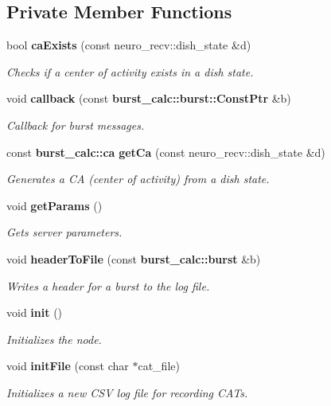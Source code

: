 \subsection*{\-Private \-Member \-Functions}
\begin{DoxyCompactItemize}
\item 
bool {\bf ca\-Exists} (const neuro\-\_\-recv\-::dish\-\_\-state \&d)
\begin{DoxyCompactList}\small\item\em \-Checks if a center of activity exists in a dish state. \end{DoxyCompactList}\item 
void {\bf callback} (const {\bf burst\-\_\-calc\-::burst\-::\-Const\-Ptr} \&b)
\begin{DoxyCompactList}\small\item\em \-Callback for burst messages. \end{DoxyCompactList}\item 
const {\bf burst\-\_\-calc\-::ca} {\bf get\-Ca} (const neuro\-\_\-recv\-::dish\-\_\-state \&d)
\begin{DoxyCompactList}\small\item\em \-Generates a \-C\-A (center of activity) from a dish state. \end{DoxyCompactList}\item 
void {\bf get\-Params} ()
\begin{DoxyCompactList}\small\item\em \-Gets server parameters. \end{DoxyCompactList}\item 
void {\bf header\-To\-File} (const {\bf burst\-\_\-calc\-::burst} \&b)
\begin{DoxyCompactList}\small\item\em \-Writes a header for a burst to the log file. \end{DoxyCompactList}\item 
void {\bf init} ()
\begin{DoxyCompactList}\small\item\em \-Initializes the node. \end{DoxyCompactList}\item 
void {\bf init\-File} (const char $\ast$cat\-\_\-file)
\begin{DoxyCompactList}\small\item\em \-Initializes a new \-C\-S\-V log file for recording \-C\-A\-Ts. \end{DoxyCompactList}\item 

\end{DoxyCompactItemize}
